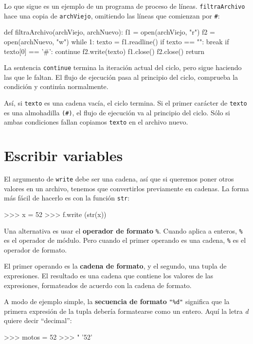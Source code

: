 Lo que sigue es un ejemplo de un programa de proceso de líneas. \texttt{filtraArchivo}
hace una copia de \texttt{archViejo}, omitiendo las líneas que comienzan
por \texttt{\#}:
\begin{pythoncode}
def filtraArchivo(archViejo, archNuevo):
  f1 = open(archViejo, "r")
  f2 = open(archNuevo, "w")
  while 1:
    texto = f1.readline()
    if texto == "":
      break
    if texto[0] == '#':
      continue
    f2.write(texto)
  f1.close()
  f2.close()
  return
\end{pythoncode}

La sentencia \texttt{continue} termina la iteración actual del ciclo,
pero sigue haciendo las que le faltan. El flujo de ejecución pasa
al principio del ciclo, comprueba la condición y continúa normalmente.

 

Así, si \texttt{texto} es una cadena vacía, el ciclo termina. Si el
primer carácter de \texttt{texto} es una almohadilla \texttt{(\#)},
el flujo de ejecución va al principio del ciclo. Sólo si ambas condiciones
fallan copiamos \texttt{texto} en el archivo nuevo.

\section{Escribir variables}

  

El argumento de \texttt{write} debe ser una cadena, así que si queremos
poner otros valores en un archivo, tenemos que convertirlos previamente
en cadenas. La forma más fácil de hacerlo es con la función \texttt{str}:
\begin{pyconcode}
>>> x = 52
>>> f.write (str(x))
\end{pyconcode}

Una alternativa es usar el \textbf{operador de formato} \texttt{\%}.
Cuando aplica a enteros, \texttt{\%} es el operador de módulo. Pero
cuando el primer operando es una cadena, \texttt{\%} es el operador
de formato.

El primer operando es la \textbf{cadena de formato}, y el segundo,
una tupla de expresiones. El resultado es una cadena que contiene
los valores de las expresiones, formateados de acuerdo con la cadena
de formato.

A modo de ejemplo simple, la \textbf{secuencia de formato} {\verb+"%d"+}
significa que la primera expresión de la tupla debería formatearse
como un entero. Aquí la letra {\em d} quiere decir ``decimal'':
\begin{pyconcode}
>>> motos = 52
>>> "%
'52'
\end{pyconcode}


